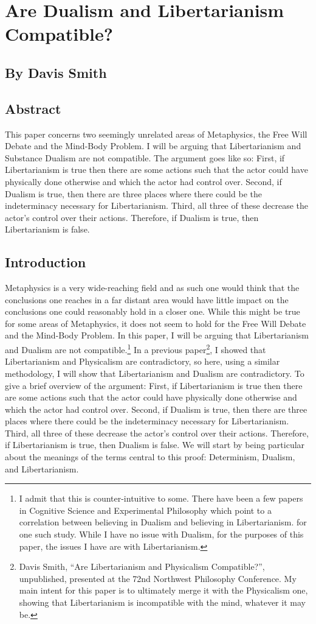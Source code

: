 \chapter{Are Dualism and Libertarianism Compatible?}
\section{By Davis Smith}
\section{Abstract}
This paper concerns two seemingly unrelated areas of Metaphysics, the Free Will Debate and the Mind-Body Problem. I will be arguing that Libertarianism and Substance Dualism are not compatible. The argument goes like so:  First, if Libertarianism is true then there are some actions such that the actor could have physically done otherwise and which the actor had control over. Second, if Dualism is true, then there are three places where there could be the indeterminacy necessary for Libertarianism. Third, all three of these decrease the actor’s control over their actions.  Therefore, if Dualism is true, then Libertarianism is false.

\section{Introduction}
Metaphysics is a very wide-reaching field and as such one would think that the conclusions one reaches in a far distant area would have little impact on the conclusions one could reasonably hold in a closer one. While this might be true for some areas of Metaphysics, it does not seem to hold for the Free Will Debate and the Mind-Body Problem. In this paper, I will be arguing that Libertarianism and Dualism are not compatible.\footnote{I admit that this is counter-intuitive to some. There have been a few papers in Cognitive Science and Experimental Philosophy which point to a correlation between believing in Dualism and believing in Libertarianism. \cite{Wisniewski1} for one such study. While I have no issue with Dualism, for the purposes of this paper, the issues I have are with Libertarianism.}  In a previous paper\footnote{Davis Smith, “Are Libertarianism and Physicalism Compatible?”, unpublished, presented at the 72nd Northwest Philosophy Conference.  My main intent for this paper is to ultimately merge it with the Physicalism one, showing that Libertarianism is incompatible with the mind, whatever it may be.}, I showed that Libertarianism and Physicalism are contradictory, so here, using a similar methodology, I will show that Libertarianism and Dualism are contradictory. To give a brief overview of the argument:  First, if Libertarianism is true then there are some actions such that the actor could have physically done otherwise and which the actor had control over. Second, if Dualism is true, then there are three places where there could be the indeterminacy necessary for Libertarianism. Third, all three of these decrease the actor’s control over their actions.  Therefore, if Libertarianism is true, then Dualism is false. We will start by being particular about the meanings of the terms central to this proof: Determinism, Dualism, and Libertarianism.
